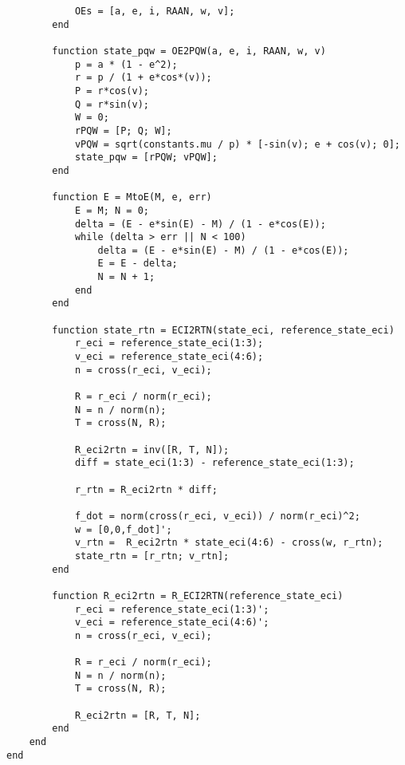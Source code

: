 \begin{lstlisting}
            OEs = [a, e, i, RAAN, w, v];
        end

        function state_pqw = OE2PQW(a, e, i, RAAN, w, v)
            p = a * (1 - e^2);
            r = p / (1 + e*cos*(v));
            P = r*cos(v);
            Q = r*sin(v);
            W = 0;
            rPQW = [P; Q; W];
            vPQW = sqrt(constants.mu / p) * [-sin(v); e + cos(v); 0];
            state_pqw = [rPQW; vPQW];
        end

        function E = MtoE(M, e, err)
            E = M; N = 0;
            delta = (E - e*sin(E) - M) / (1 - e*cos(E));
            while (delta > err || N < 100)
                delta = (E - e*sin(E) - M) / (1 - e*cos(E));
                E = E - delta;
                N = N + 1;
            end
        end

        function state_rtn = ECI2RTN(state_eci, reference_state_eci)
            r_eci = reference_state_eci(1:3);
            v_eci = reference_state_eci(4:6);
            n = cross(r_eci, v_eci);

            R = r_eci / norm(r_eci);
            N = n / norm(n);
            T = cross(N, R);

            R_eci2rtn = inv([R, T, N]);
            diff = state_eci(1:3) - reference_state_eci(1:3);

            r_rtn = R_eci2rtn * diff;
            
            f_dot = norm(cross(r_eci, v_eci)) / norm(r_eci)^2;
            w = [0,0,f_dot]';
            v_rtn =  R_eci2rtn * state_eci(4:6) - cross(w, r_rtn);
            state_rtn = [r_rtn; v_rtn];
        end

        function R_eci2rtn = R_ECI2RTN(reference_state_eci)
            r_eci = reference_state_eci(1:3)';
            v_eci = reference_state_eci(4:6)';
            n = cross(r_eci, v_eci);

            R = r_eci / norm(r_eci);
            N = n / norm(n);
            T = cross(N, R);

            R_eci2rtn = [R, T, N];
        end
    end
end
\end{lstlisting}

